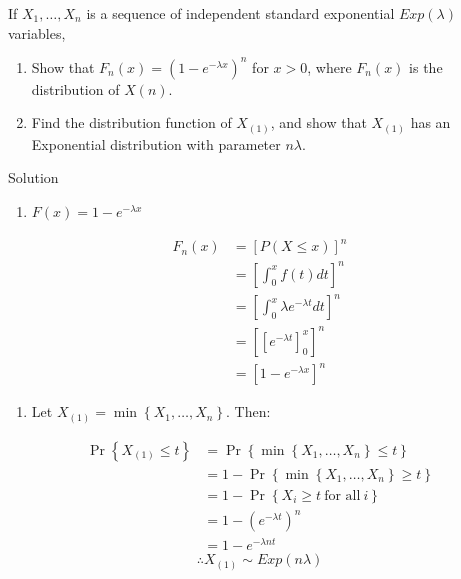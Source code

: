\documentclass[
  letterpaper,
  DIV=11,
  numbers=noendperiod,
  oneside]{scrartcl}
\providecommand{\tightlist}{%
  \setlength{\itemsep}{0pt}\setlength{\parskip}{0pt}}\usepackage{longtable,booktabs,array}
\begin{document}
\begin{tcolorbox}[enhanced jigsaw, colframe=quarto-callout-warning-color-frame, toptitle=1mm, toprule=.15mm, bottomtitle=1mm, titlerule=0mm, coltitle=black, left=2mm, rightrule=.15mm, arc=.35mm, colback=white, title={Task 9}, breakable, opacitybacktitle=0.6, opacityback=0, bottomrule=.15mm, leftrule=.75mm, colbacktitle=quarto-callout-warning-color!10!white]

If \(X_1, \dots, X_n\) is a sequence of independent standard exponential
\(Exp(\lambda)\) variables,

\begin{enumerate}
\def\labelenumi{(\alph{enumi})}
\tightlist
\item
  Show that \(F_n(x)= (1-e^{-\lambda x})^n\) for \(x> 0\), where
  \(F_n(x)\) is the distribution of \(X(n)\).
\item
  Find the distribution function of \(X_{(1)}\), and show that
  \(X_{(1)}\) has an Exponential distribution with parameter
  \(n\lambda\).
\end{enumerate}

Solution

\begin{enumerate}
\def\labelenumi{(\alph{enumi})}
\tightlist
\item
  \(F(x) = 1 - e^{-\lambda x}\)
\end{enumerate}

\[\begin{split} F_n(x) &= [P(X \leq x)]^n\\ &=\left[ \int_0^x f(t) dt\right]^n\\ &=\left[\int_0^x \lambda e^{-\lambda t} dt \right]^n\\ &=\left[ \left[ e^{-\lambda t}\right]_0^x\right]^n\\ &=\left[ 1 - e^{-\lambda x}\right]^n \end{split}\]

\begin{enumerate}
\def\labelenumi{(\alph{enumi})}
\setcounter{enumi}{1}
\tightlist
\item
  Let \(X_{(1)} = \min\left\{X_1, \dots, X_n \right\}\). Then:
\end{enumerate}

\[\begin{split} \Pr\left\{ X_{(1)} \leq t\right\} &= \Pr\left\{ \min\left\{X_1, \dots, X_n \right\} \leq t\right\}\\ &= 1 - \Pr\left\{ \min\left\{X_1, \dots, X_n \right\} \geq t\right\}\\ &= 1 - \Pr \left\{ X_i \geq t \ \text{for all} \ i\right\}\\ &= 1 - (e^{-\lambda t})^n\\ &= 1 - e^{-\lambda nt} \end{split}\]
\[\therefore X_{(1)} \sim Exp(n \lambda)\]

\end{tcolorbox}
\end{document}
